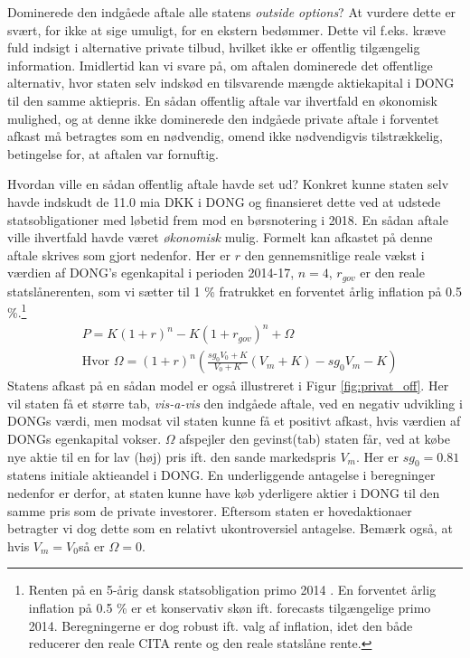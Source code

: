 \documentclass{article}
\begin{document}
Dominerede den indgåede aftale alle statens \emph{outside options}? At vurdere dette er svært, for ikke at sige umuligt, for en ekstern bedømmer. Dette vil f.eks. kræve fuld indsigt i alternative private tilbud, hvilket ikke er offentlig tilgængelig information. Imidlertid kan vi svare på, om aftalen dominerede det offentlige alternativ, hvor staten selv indskød en tilsvarende mængde aktiekapital i DONG til den samme aktiepris. En sådan offentlig aftale var ihvertfald en økonomisk mulighed, og at denne ikke dominerede den indgåede private aftale i forventet afkast må betragtes som en nødvendig, omend ikke nødvendigvis tilstrækkelig, betingelse for, at aftalen var fornuftig. 

Hvordan ville en sådan offentlig aftale havde set ud? Konkret kunne staten selv havde indskudt de 11.0 mia DKK i DONG og finansieret dette ved at udstede statsobligationer med løbetid frem mod en børsnotering i 2018. En sådan aftale ville ihvertfald havde været \emph{økonomisk} mulig. Formelt kan afkastet på denne aftale skrives som gjort nedenfor. Her er $r$ den gennemsnitlige reale vækst i værdien af DONG's egenkapital i perioden 2014-17, $n=4$, $r_{gov}$ er den reale statslånerenten, som vi sætter til 1 \% fratrukket en forventet årlig inflation på 0.5 \%.\footnote{Renten på en 5-årig dansk statsobligation primo 2014 \citep{NB2014}. En forventet årlig inflation på 0.5 \% er et konservativ skøn  ift. forecasts tilgængelige primo 2014. Beregningerne er dog robust ift. valg af inflation, idet den både reducerer den reale CITA rente og den reale statslåne rente.}
\begin{align}
&P=K(1+r)^n-K(1+r_{gov})^n +\Omega \\
&\text{Hvor } \Omega=(1+r)^n\left( \frac{sg_0 V_0+K}{V_0+K} \left( V_m+K \right)-sg_0 V_m -K\right)\nonumber
\label{eq:gov_capital}
\end{align}
Statens afkast på en sådan model er også illustreret i Figur \ref{fig:privat_off}. Her vil staten få et større tab, \emph{vis-a-vis} den indgåede aftale, ved en negativ udvikling i DONGs værdi, men modsat vil staten kunne få et positivt afkast, hvis værdien af DONGs egenkapital vokser. $\Omega$ afspejler den gevinst(tab) staten får, ved at købe nye aktie til en for lav (høj) pris ift. den sande markedspris $V_m$. Her er $sg_0=0.81$ statens initiale aktieandel i DONG. En underliggende antagelse i beregninger nedenfor er derfor, at staten kunne have køb yderligere aktier i DONG til den samme pris som de private investorer. Eftersom staten er hovedaktionaer betragter vi dog dette som en relativt ukontroversiel antagelse. Bemærk også, at hvis $V_m=V_0$så er $\Omega=0$.
\end{document}
